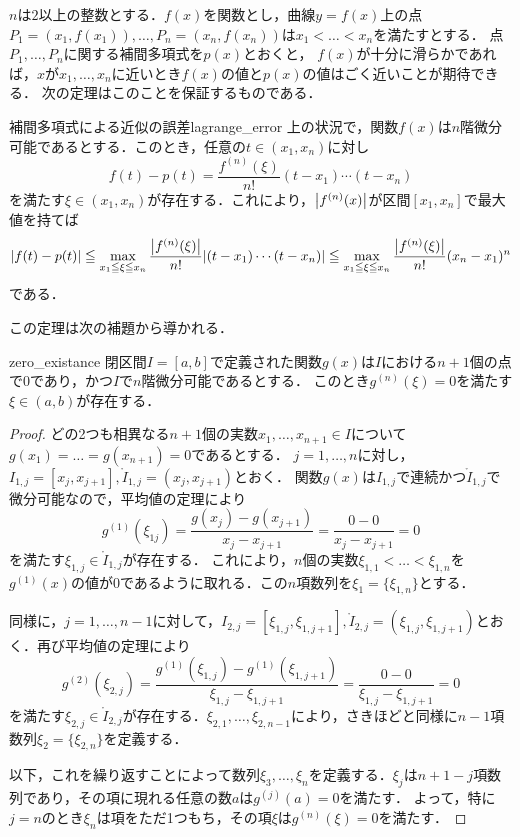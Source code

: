\documentclass[a4paper]{ltjsarticle}
\theoremstyle{definition}
\DeclarePairedDelimiter{\abs}{\lvert}{\rvert}
\begin{document}
$n$は$2$以上の整数とする．$f(x)$を関数とし，曲線$y=f(x)$上の点$P_1=(x_1, f(x_1)),\dots,P_n=(x_n, f(x_n))$は$x_1<\dots<x_n$を満たすとする．
点$P_1,\dots,P_n$に関する補間多項式を$p(x)$とおくと，
$f(x)$が十分に滑らかであれば，$x$が$x_1,\dots,x_n$に近いとき$f(x)$の値と$p(x)$の値はごく近いことが期待できる．
次の定理はこのことを保証するものである．

\begin{theorem}{補間多項式による近似の誤差}{lagrange_error}
  上の状況で，関数$f(x)$は$n$階微分可能であるとする．このとき，任意の$t\in (x_1,x_n)$に対し
  \[
    f(t)-p(t) = \frac{f^{(n)} (\xi)}{n!} (t-x_1)\dotsm (t-x_n)
  \]
  を満たす$\xi \in (x_1, x_n)$が存在する．これにより，$\abs*{f^{(n)}(x)}$が区間$[x_1, x_n]$で最大値を持てば
  \[
    \abs*{f(t)-p(t)}
    \leqq \max_{x_1\leqq\xi\leqq x_n} \frac{\abs*{f^{(n)}(\xi)}}{n!} \abs*{(t-x_1)\dotsm (t-x_n)}
    \leqq \max_{x_1\leqq\xi\leqq x_n} \frac{\abs*{f^{(n)}(\xi)}}{n!} (x_n-x_1)^n
  \]
  である．
\end{theorem}

この定理は次の補題から導かれる．

\begin{lemma}{}{zero_existance}
  閉区間$I=[a,b]$で定義された関数$g(x)$は$I$における$n+1$個の点で$0$であり，かつ$I$で$n$階微分可能であるとする．
  このとき$g^{(n)}(\xi) = 0$を満たす$\xi \in (a,b)$が存在する．
\end{lemma}

\begin{proof}
  どの2つも相異なる$n+1$個の実数$x_1,\dots,x_{n+1} \in I$について$g(x_1) = \dots = g(x_{n+1}) =0$であるとする．
  $j=1,\dots,n$に対し，$I_{1,j}=[x_j,x_{j+1}], \mathring{I}_{1,j}=(x_j,x_{j+1})$とおく．
  関数$g(x)$は$I_{1,j}$で連続かつ$\mathring{I}_{1,j}$で微分可能なので，平均値の定理により
  \[
    g^{(1)}(\xi_{1j}) = \frac{g(x_j)-g(x_{j+1})}{x_j-x_{j+1}} = \frac{0-0}{x_j-x_{j+1}}=0
  \]
  を満たす$\xi_{1,j} \in \mathring{I}_{1,j}$が存在する．
  これにより，$n$個の実数$\xi_{1,1} < \dots < \xi_{1,n}$を$g^{(1)}(x)$の値が$0$であるように取れる．この$n$項数列を$\xi_1 = \{ \xi_{1,n} \}$とする．

  同様に，$j=1,\dots,n-1$に対して，$I_{2,j}=[\xi_{1,j},\xi_{1,j+1}], \mathring{I}_{2,j}=(\xi_{1,j},\xi_{1,j+1})$とおく．再び平均値の定理により
  \[
    g^{(2)}(\xi_{2,j}) = \frac{g^{(1)}(\xi_{1,j})-g^{(1)}(\xi_{1,j+1})}{\xi_{1,j}-\xi_{1,j+1}} = \frac{0-0}{\xi_{1,j}-\xi_{1,j+1}} = 0
  \]
  を満たす$\xi_{2,j} \in \mathring{I}_{2,j}$が存在する．$\xi_{2,1},\dots,\xi_{2,n-1}$により，さきほどと同様に$n-1$項数列$\xi_2 = \{ \xi_{2,n} \}$を定義する．

  以下，これを繰り返すことによって数列$\xi_3,\dots,\xi_n$を定義する．$\xi_j$は$n+1-j$項数列であり，その項に現れる任意の数$a$は$g^{(j)}(a)=0$を満たす．
  よって，特に$j=n$のとき$\xi_n$は項をただ1つもち，その項$\xi$は$g^{(n)}(\xi)=0$を満たす．
\end{proof}
\end{document}
